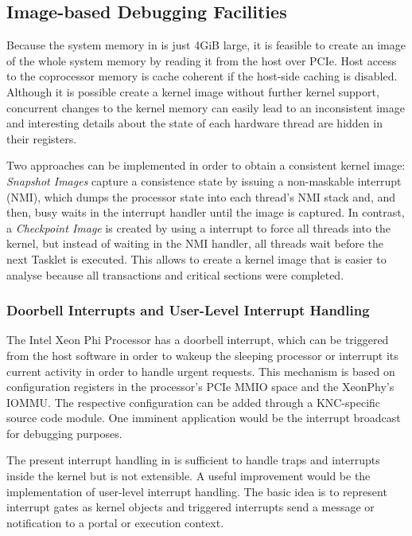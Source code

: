 \subsection{Image-based Debugging Facilities}

Because the system memory in \mythos is just 4GiB large, it is
feasible to create an image of the whole system memory by reading it
from the host over PCIe.  Host access to the coprocessor memory is
cache coherent if the host-side caching is disabled. Although it is
possible create a kernel image without further kernel support,
concurrent changes to the kernel memory can easily lead to an
inconsistent image and interesting details about the state of each
hardware thread are hidden in their registers.

Two approaches can be implemented in order to obtain a consistent
kernel image: \emph{Snapshot Images} capture a consistence state by
issuing a non-maskable interrupt (NMI), which dumps the processor
state into each thread's NMI stack and, and then, busy waits in the
interrupt handler until the image is captured.  In contrast, a
\emph{Checkpoint Image} is created by using a interrupt to force all
threads into the kernel, but instead of waiting in the NMI handler,
all threads wait before the next Tasklet is executed. This allows to
create a kernel image that is easier to analyse because all
transactions and critical sections were completed.

\subsubsection{Doorbell Interrupts and User-Level Interrupt Handling}
The Intel Xeon Phi Processor has a doorbell interrupt, which can be
triggered from the host software in order to wakeup the sleeping
processor or interrupt its current activity in order to handle urgent
requests. This mechanism is based on configuration registers in the
processor's PCIe MMIO space and the XeonPhy's IOMMU.  The respective
configuration can be added through a KNC-specific source code
module. One imminent application would be the interrupt broadcast for
debugging purposes.

The present interrupt handling in \mythos is sufficient to handle
traps and interrupts inside the kernel but is not extensible. A useful
improvement would be the implementation of user-level interrupt
handling. The basic idea is to represent interrupt gates as kernel
objects and triggered interrupts send a message or notification to a
portal or execution context.


